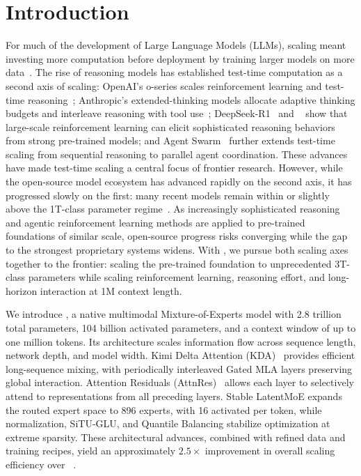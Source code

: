 \section{Introduction}
\label{sec:intro}

For much of the development of Large Language Models (LLMs), scaling meant investing more computation before deployment by training larger models on more data~\citep{kaplan2020scaling,hoffmann2022training}.
The rise of reasoning models has established test-time computation as a second axis of scaling: OpenAI's o-series scales reinforcement learning and test-time reasoning~\citep{openai2024o1,openai2025o3}; Anthropic's extended-thinking models allocate adaptive thinking budgets and interleave reasoning with tool use~\citep{anthropic2025extendedthinking,anthropic2025claude4}; DeepSeek-R1~\citep{deepseekai2025deepseekr1} and ~\citep{kimik15} show that large-scale reinforcement learning can elicit sophisticated reasoning behaviors from strong pre-trained models; and  Agent Swarm~\citep{kimik25} further extends test-time scaling from sequential reasoning to parallel agent coordination.
These advances have made test-time scaling a central focus of frontier research.
However, while the open-source model ecosystem has advanced rapidly on the second axis, it has progressed slowly on the first: many recent models remain within or slightly above the 1T-class parameter regime~\citep{glm5team2026glm5vibecodingagentic,deepseekv4,mimo2026v25pro,thinkingmachines2026inkling}.
As increasingly sophisticated reasoning and agentic reinforcement learning methods are applied to pre-trained foundations of similar scale, open-source progress risks converging while the gap to the strongest proprietary systems widens.
With , we pursue both scaling axes together to the frontier: scaling the pre-trained foundation to unprecedented 3T-class parameters while scaling reinforcement learning, reasoning effort, and long-horizon interaction at 1M context length.


We introduce , a native multimodal Mixture-of-Experts model with 2.8 trillion total parameters, 104 billion activated parameters, and a context window of up to one million tokens.
Its architecture scales information flow across sequence length, network depth, and model width.
Kimi Delta Attention (KDA)~\citep{team2025kimi} provides efficient long-sequence mixing, with periodically interleaved Gated MLA layers preserving global interaction. Attention Residuals (AttnRes)~\citep{kimiteam2026attnres} allows each layer to selectively attend to representations from all preceding layers. Stable LatentMoE expands the routed expert space to 896 experts, with 16 activated per token, while normalization, SiTU-GLU, and Quantile Balancing stabilize optimization at extreme sparsity. These architectural advances, combined with refined data and training recipes, yield an approximately $2.5\times$ improvement in overall scaling efficiency over ~\cite{kimiteam2025kimik2openagentic}.

